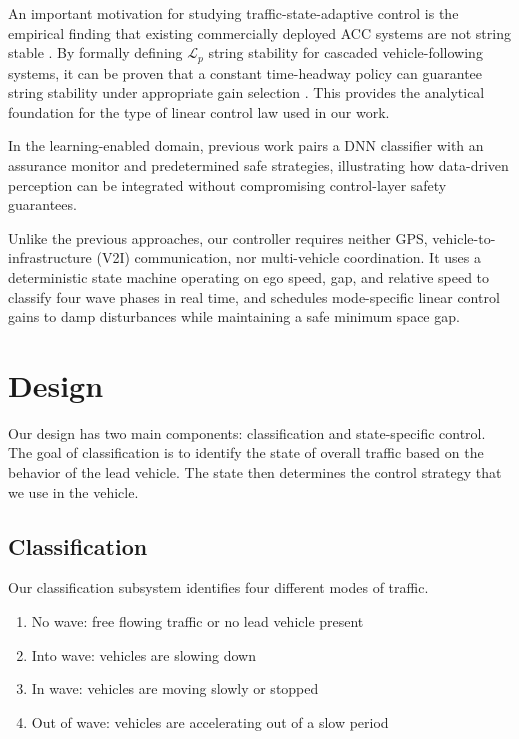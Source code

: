 \documentclass[conference]{IEEEtran}
\begin{document}
An important motivation for studying traffic-state-adaptive control is the empirical finding that existing commercially deployed ACC systems are not string stable \cite{Gunter2021StringStable}. By formally defining $\mathcal{L}_p$ string stability for cascaded vehicle-following systems, it can be proven that a constant time-headway policy can guarantee string stability under appropriate gain selection \cite{Ploeg2014}. This provides the analytical foundation for the type of linear control law used in our work.

In the learning-enabled domain, previous work \cite{s21186089} pairs a DNN classifier with an assurance monitor and predetermined safe strategies, illustrating how data-driven perception can be integrated without compromising control-layer safety guarantees.

Unlike the previous approaches, our controller requires neither GPS, vehicle-to-infrastructure (V2I) communication, nor multi-vehicle coordination. It uses a deterministic state machine operating on ego speed, gap, and relative speed to classify four wave phases in real time, and schedules mode-specific linear control gains to damp disturbances while maintaining a safe minimum space gap.

\section{Design}
Our design has two main components: classification and state-specific control. The goal of classification is to identify the state of overall traffic based on the behavior of the lead vehicle. The state then determines the control strategy that we use in the vehicle.

\subsection{Classification}

Our classification subsystem identifies four different modes of traffic.

\begin{enumerate}

    \item No wave: free flowing traffic or no lead vehicle present
    \item Into wave: vehicles are slowing down
    \item In wave: vehicles are moving slowly or stopped
    \item Out of wave: vehicles are accelerating out of a slow period
    
\end{enumerate}
\end{document}
